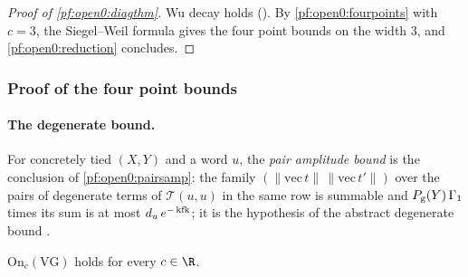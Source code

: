 \begin{proof}[Proof of \cref{pf:open0:diagthm}]
Wu decay holds (). By \cref{pf:open0:fourpoints} with $c=3$, the Siegel--Weil formula gives
the four point bounds on the width $3$, and \cref{pf:open0:reduction} concludes.
\end{proof}

\subsubsection{Proof of the four point bounds}\label{sec:pf:open0:fourpf}

\paragraph{The degenerate bound.}
For concretely tied $(X,Y)$ and a word $u$, the \emph{pair amplitude bound} is the conclusion of \cref{pf:open0:pairsamp}: the
family $(\|\mathrm{vec}\,t\|\,\|\mathrm{vec}\,t'\|)$ over the pairs of degenerate terms of $\mathcal T(u,u)$ in the same row is summable and
$P_{\mathrm g}(Y)\,\Gamma_1$ times its sum is at most $d_u\,e^{-\operatorname{kfk}}$; it is the hypothesis of the abstract degenerate bound
.

\begin{proposition}\label{pf:open0:deg}
$\mathrm{On}_c(\mathrm{VG})$ holds for every $c\in\R$.
\
\
\ 
\end{proposition}

